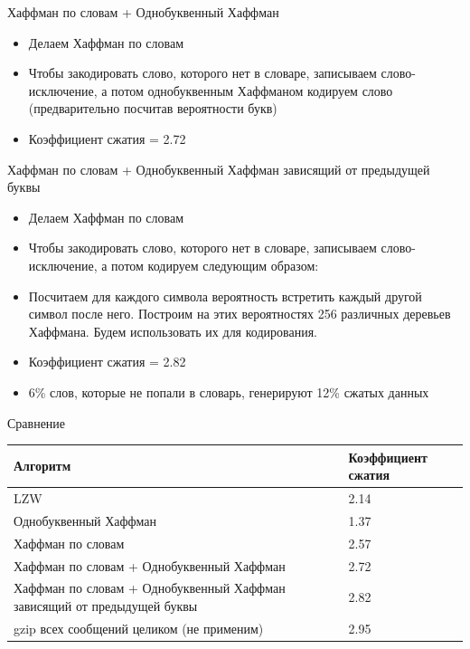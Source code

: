 \documentclass[t,13pt,graphics=pdflatex,xcolor=table,aspectratio=43]{beamer}
\begin{document}
\begin{frame}{Хаффман по словам + Однобуквенный Хаффман}    
\begin{itemize}
    \item Делаем Хаффман по словам
    \item Чтобы закодировать слово, которого нет в словаре, записываем слово-исключение, а потом однобуквенным Хаффманом кодируем слово (предварительно посчитав вероятности букв)
    \item Коэффициент сжатия = 2.72
\end{itemize}
\end{frame}

\begin{frame}{Хаффман по словам + Однобуквенный Хаффман зависящий от предыдущей буквы}    
\begin{itemize}
    \item Делаем Хаффман по словам
    \item Чтобы закодировать слово, которого нет в словаре, записываем слово-исключение, а потом кодируем следующим образом:
    \item Посчитаем для каждого символа вероятность встретить каждый другой символ после него. Построим на этих вероятностях 256 различных деревьев Хаффмана. Будем использовать их для кодирования.
    \item Коэффициент сжатия = 2.82
    \item 6\% слов, которые не попали в словарь, генерируют 12\% сжатых данных
\end{itemize}
\end{frame}

\begin{frame}{Сравнение}
\begin{center}
\begin{tabular}{| p{5cm} | l |}
    \hline 
    Алгоритм & Коэффициент сжатия \\
    \hline 
    LZW & 2.14 \\
    \hline 
    Однобуквенный Хаффман & 1.37 \\
    \hline 
    Хаффман по словам & 2.57 \\
    \hline 
    Хаффман по словам + Однобуквенный Хаффман & 2.72 \\
    \hline 
    Хаффман по словам + Однобуквенный Хаффман зависящий от предыдущей буквы & 2.82 \\
    \hline 
    gzip всех сообщений целиком (не применим) & 2.95 \\
    \hline
\end{tabular}
\end{center}
\end{frame}
\end{document}
